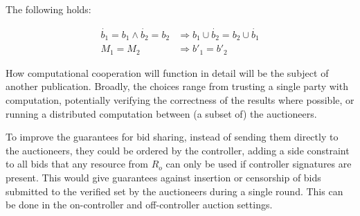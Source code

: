 The following holds:

\begin{equation}
\begin{aligned}
    \dot{b_1} = b_1 \wedge \dot{b_2} = b_2 &\Rightarrow b_1 \cup \dot{b_2} = b_2 \cup \dot{b_1} \\
    M_1 = M_2 &\Rightarrow b'_1 = b'_2
\end{aligned}
\end{equation}

How computational cooperation will function in detail will be the subject of another publication. Broadly, the choices range from trusting a single party with computation, potentially verifying the correctness of the results where possible, or running a distributed computation between (a subset of) the auctioneers.

To improve the guarantees for bid sharing, instead of sending them directly to the auctioneers, they could be ordered by the controller, adding a side constraint to all bids that any resource from $R_o$ can only be used if controller signatures are present. This would give guarantees against insertion or censorship of bids submitted to the verified set by the auctioneers during a single round. This can be done in the on-controller and off-controller auction settings.


    


